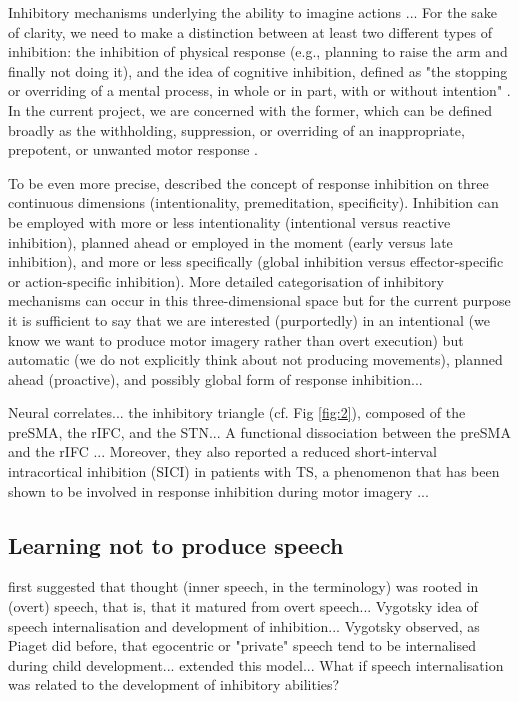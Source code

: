 \documentclass[utf8]{template/frontiersSCNS} %
\begin{document}
Inhibitory mechanisms underlying the ability to imagine actions \citep{guillot_imagining_2012, schwoebel_man_2002}... For the sake of clarity, we need to make a distinction between at least two different types of inhibition: the inhibition of physical response (e.g., planning to raise the arm and finally not doing it), and the idea of cognitive inhibition, defined as "the stopping or overriding of a mental process, in whole or in part, with or without intention" \citep{gorfein_concept_2007}. In the current project, we are concerned with the former, which can be defined broadly as the withholding, suppression, or overriding of an inappropriate, prepotent, or unwanted motor response \citep{aron_neural_2007, oshea_go_2018}.

To be even more precise, \cite{ridderinkhof_dont_2014} described the concept of response inhibition on three continuous dimensions (intentionality, premeditation, specificity). Inhibition can be employed with more or less intentionality (intentional versus reactive inhibition), planned ahead or employed in the moment (early versus late inhibition), and more or less specifically (global inhibition versus effector-specific or action-specific inhibition). More detailed categorisation of inhibitory mechanisms can occur in this three-dimensional space but for the current purpose it is sufficient to say that we are interested (purportedly) in an intentional (we know we want to produce motor imagery rather than overt execution) but automatic (we do not explicitly think about not producing movements), planned ahead (proactive), and possibly global form of response inhibition...

Neural correlates... the inhibitory triangle (cf. Fig \ref{fig:2}), composed of the preSMA, the rIFC, and the STN... A functional dissociation between the preSMA and the rIFC \citep{diesburg_pause-then-cancel_2021}... Moreover, they also reported a reduced short-interval intracortical inhibition (SICI) in patients with TS, a phenomenon that has been shown to be involved in response inhibition during motor imagery \citep{neige_unravelling_2020}...

\subsection{Learning not to produce speech}

\cite{watson_psychology_1919} first suggested that thought (inner speech, in the terminology) was rooted in (overt) speech, that is, that it matured from overt speech... Vygotsky idea of speech internalisation and development of inhibition... Vygotsky observed, as Piaget did before, that egocentric or "private" speech tend to be internalised during child development... \cite{fernyhough_alien_2004} extended this model... What if speech internalisation was related to the development of inhibitory abilities?
\end{document}
